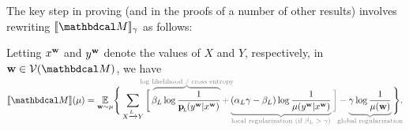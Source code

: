 \documentclass{article}
\begin{document}
	The key step in proving 
	(and in the proofs of a number of other results) involves 
	rewriting  
	$\bbr{\dg M}_\gamma$ as follows: 
	\begin{prop}%
	 Letting $x^{\mathbf w}$ and $y^{\mathbf w}$ denote the values of
	  $X$ and $Y$, respectively, in $\mat w \in \V(\dg M)$, 
	we have 
	\begin{equation}\label{eq:semantics-breakdown}
	\begin{split}
	\bbr{\dg M}(\mu) =  \Ex_{\mat w \sim \mu}\! \Bigg\{
	 \sum_{ X \xrightarrow{\!\!L} Y  }
	\bigg[\,
	    \color{gray}\overbrace{\color{black}
	      \!\beta_L \log \frac{1}{\bp(y^{\mat w} |x^{\mat w})}
		}^{\color{gray}\smash{\mathclap{\text{log likelihood / cross entropy}}}} +
	    \color{gray}\underbrace{\color{black} 
	({\alpha_L}\gamma - \beta_L ) \log \frac{1}{\mu(y^{\mat w} |x^{\mat w})} 
		}_{\color{gray}\smash{\mathclap{\text{local regularization (if $\beta_L > \gamma$)}}}}\bigg] - \underbrace{\color{black}
	\gamma \log \frac{1}{\mu(\mat w)}
		}_{\color{gray}\smash{\mathclap{\text{global
	        regularization}}}}\color{black} \Bigg\} .
	\end{split}
	\end{equation}
	\end{prop}
\end{document}
